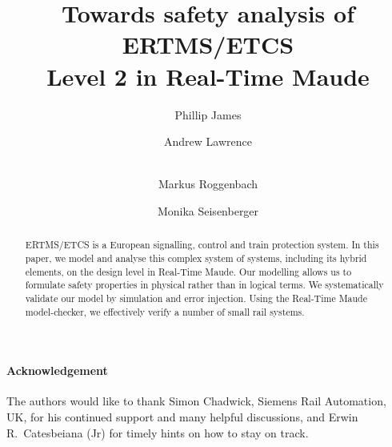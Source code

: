 \documentclass[runningheads,a4paper]{llncs}
\begin{document}
\mainmatter 

\title{Towards safety analysis of ERTMS/ETCS \\ Level 2 in Real-Time
  Maude}


\author{Phillip James \and Andrew Lawrence  \and \\ 
Markus Roggenbach \and  Monika Seisenberger}
%


\maketitle

\begin{abstract}
ERTMS/ETCS is a European signalling, control and train protection
system. In this paper, we model and analyse this complex system of
systems, including its hybrid elements, on the design level in
Real-Time Maude. Our modelling allows us to formulate safety
properties in physical rather than in logical terms. %
We systematically validate our model by simulation and error
injection. Using the Real-Time Maude model-checker, we effectively
verify a number of small rail systems.
\end{abstract}


















\paragraph{Acknowledgement} 
The authors would like to thank Simon Chadwick, Siemens Rail
Automation, UK, for his continued support and many helpful
discussions, and Erwin R.\ Catesbeiana (Jr) for timely hints on how to
stay on track.



\end{document}
